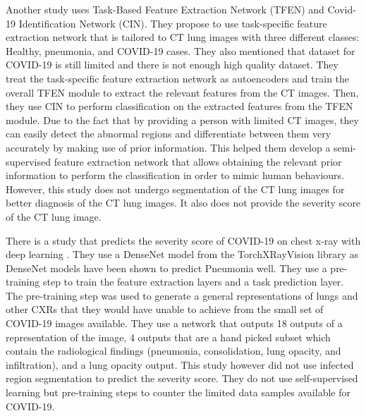 Another study \cite{ref27} uses Task-Based Feature Extraction Network (TFEN) and Covid-19 Identification Network (CIN).  They propose to use task-specific feature extraction network that is tailored to CT lung images with three different classes: Healthy, pneumonia, and COVID-19 cases. They also mentioned that dataset for COVID-19 is still limited and there is not enough high quality dataset. They treat the task-specific feature extraction network as autoencoders and train the overall TFEN module to extract the relevant features from the CT images. Then, they use CIN to perform classification on the extracted features from the TFEN module. Due to the fact that by providing a person with limited CT images, they can easily detect the abnormal regions and differentiate between them very accurately by making use of prior information. This helped them develop a semi-supervised feature extraction network that allows obtaining the relevant prior information to perform the classification in order to mimic human behaviours. However, this study does not undergo segmentation of the CT lung images for better diagnosis of the CT lung images. It also does not provide the severity score of the CT lung image.

There is a study that predicts the severity score of COVID-19 on chest x-ray with deep learning \cite{ref28}. They use a DenseNet model from the TorchXRayVision library as DenseNet models have been shown to predict Pneumonia well. They use a pre-training step to train the feature extraction layers and a task prediction layer. The pre-training step was used to generate a general representations of lungs and other CXRs that they would have unable to achieve from the small set of COVID-19 images available. They use a network that outputs 18 outputs of a representation of the image, 4 outputs that are a hand picked subset which contain the radiological findings (pneumonia, consolidation, lung opacity, and infiltration), and a lung opacity output. This study however did not use infected region segmentation to predict the severity score. They do not use self-supervised learning but pre-training steps to counter the limited data samples available for COVID-19.

